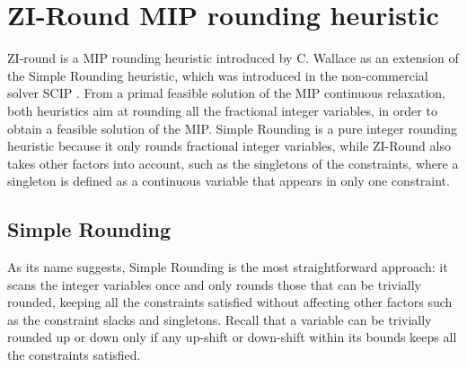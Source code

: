 \documentclass[a4paper,12pt]{book}
\begin{document}
\tableofcontents

\pagestyle{fancy}
\fancyhf{}
\fancyhead[RE,LO]{\rightmark}
\fancyfoot[CE,CO]{\thepage}
\renewcommand{\headrulewidth}{0pt}

\mainmatter


\chapter{ZI-Round MIP rounding heuristic} \label{ch:ziround}

ZI-round is a MIP rounding heuristic introduced by C. Wallace \cite{wallace2010} as an extension of the Simple Rounding heuristic, which was introduced in the non-commercial solver SCIP \cite{scip}.
From a primal feasible solution of the MIP continuous relaxation, both heuristics aim at rounding all the fractional integer variables, in order to obtain a feasible solution of the MIP. Simple Rounding is a pure integer rounding heuristic because it only rounds fractional integer variables, while ZI-Round also takes other factors into account, such as the singletons of the constraints, where a singleton is defined as a continuous variable that appears in only one constraint. \par

\section{Simple Rounding}
As its name suggests, Simple Rounding is the most straightforward approach: it scans the integer variables once and only rounds those that can be trivially rounded, keeping all the constraints satisfied without affecting other factors such as the constraint slacks and singletons.
Recall that a variable can be trivially rounded up or down only if any up-shift or down-shift within its bounds keeps all the constraints satisfied. \par
\end{document}
